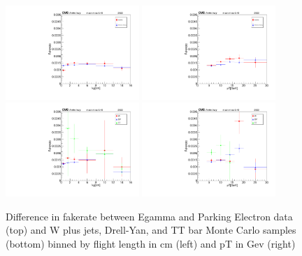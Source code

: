 \begin{figure}[!htb]
  \begin{center}
    \includegraphics[width=0.45\textwidth]{figures/chapter4/fakerate/playV0-ks_kin_lxy_muidbdt40_EGamma_v_Parking_overlay.pdf}
    \includegraphics[width=0.45\textwidth]{figures/chapter4/fakerate/playV0-ks_kin_pT_muidbdt40_EGamma_v_Parking_overlay.pdf} \\
    \includegraphics[width=0.45\textwidth]{figures/chapter4/fakerate/playV0-ks_kin_lxy_muidbdt40_W_v_DY_v_TT_overlay.pdf}
    \includegraphics[width=0.45\textwidth]{figures/chapter4/fakerate/playV0-ks_kin_pT_muidbdt40_W_v_DY_v_TT_overlay.pdf}
  \end{center}
  \caption{Difference in fakerate between Egamma and Parking Electron data (top) and W plus jets, Drell-Yan, and TT bar Monte Carlo samples (bottom) binned by flight length in cm (left) and pT in Gev (right)}
  \label{fig:pion_fake_rate_systematics}
\end{figure}

